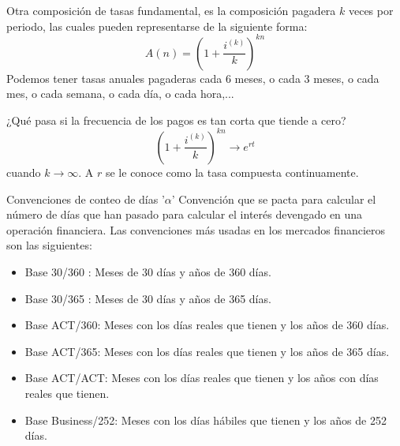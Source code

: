 \documentclass[11pt]{beamer}
\begin{document}
\begin{frame}{{}}
		Otra composición de tasas fundamental, es la composición pagadera $k$ veces por periodo, las cuales pueden representarse de la siguiente forma:
	\begin{equation}
	A(n)=\left(1+\frac{i^{(k)}}{k} \right)^{kn}
	\end{equation}
	 Podemos tener tasas anuales pagaderas cada 6 meses, o cada 3 meses, o cada mes, o cada semana, o cada día, o cada hora,...\medskip
	
	¿Qué pasa si la frecuencia de los pagos es tan corta que tiende a cero?
	\begin{equation}
	\label{eq:contcompound}
	\left(1+\frac{i^{(k)}}{k} \right)^{kn} \rightarrow e^{r t}
	\end{equation}
	cuando $k \rightarrow \infty$. A $r$ se le conoce como la tasa compuesta continuamente.
\end{frame}
\begin{frame}{Convenciones de conteo de días '$\alpha$'}
	Convención que se pacta para calcular el número de días que han pasado para calcular el interés devengado en una operación financiera.
	Las convenciones más usadas en los mercados financieros son las siguientes: 
	\begin{itemize}
		\item Base 30/360 : Meses de 30 días y años de 360 días.
		\item Base 30/365 : Meses de 30 días y años de 365 días.
		\item Base ACT/360: Meses con los días reales que tienen y los años de 360 días.
		\item Base ACT/365: Meses con los días reales que tienen y los años de 365 días.
		\item Base ACT/ACT: Meses con los días reales que tienen y los años con días reales que tienen.
		\item Base Business/252: Meses con los días hábiles que tienen y los años de 252 días.
	\end{itemize}
	 
\end{frame}
\end{document}
